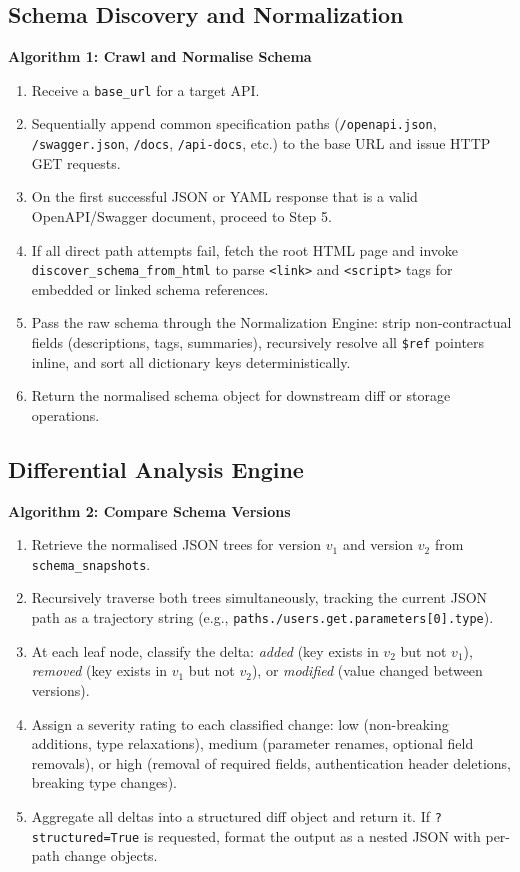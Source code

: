 \documentclass{fisatprojectfinal}
\begin{document}
\subsection{Schema Discovery and Normalization}
\textbf{Algorithm 1: Crawl and Normalise Schema}
\begin{enumerate}[label=\textbf{Step \arabic*:}]
    \item Receive a \texttt{base\_url} for a target API.
    \item Sequentially append common specification paths (\texttt{/openapi.json}, \texttt{/swagger.json}, \texttt{/docs}, \texttt{/api-docs}, etc.) to the base URL and issue HTTP GET requests.
    \item On the first successful JSON or YAML response that is a valid OpenAPI/Swagger document, proceed to Step 5.
    \item If all direct path attempts fail, fetch the root HTML page and invoke \texttt{discover\_schema\_from\_html} to parse \texttt{<link>} and \texttt{<script>} tags for embedded or linked schema references.
    \item Pass the raw schema through the Normalization Engine: strip non-contractual fields (descriptions, tags, summaries), recursively resolve all \texttt{\$ref} pointers inline, and sort all dictionary keys deterministically.
    \item Return the normalised schema object for downstream diff or storage operations.
\end{enumerate}

\subsection{Differential Analysis Engine}
\textbf{Algorithm 2: Compare Schema Versions}
\begin{enumerate}[label=\textbf{Step \arabic*:}]
    \item Retrieve the normalised JSON trees for version $v_1$ and version $v_2$ from \texttt{schema\_snapshots}.
    \item Recursively traverse both trees simultaneously, tracking the current JSON path as a trajectory string (e.g., \texttt{paths./users.get.parameters[0].type}).
    \item At each leaf node, classify the delta: \textit{added} (key exists in $v_2$ but not $v_1$), \textit{removed} (key exists in $v_1$ but not $v_2$), or \textit{modified} (value changed between versions).
    \item Assign a severity rating to each classified change: low (non-breaking additions, type relaxations), medium (parameter renames, optional field removals), or high (removal of required fields, authentication header deletions, breaking type changes).
    \item Aggregate all deltas into a structured diff object and return it. If \texttt{?structured=True} is requested, format the output as a nested JSON with per-path change objects.
\end{enumerate}
\end{document}
